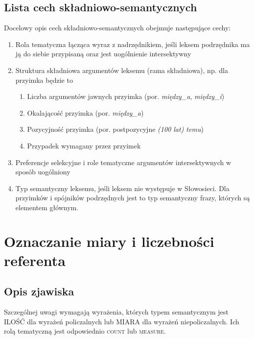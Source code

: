 \documentclass[a4paper, 12pt]{article}
\theoremstyle{remark}
\begin{document}
\subsection{Lista cech składniowo-semantycznych} %
\label{sub:cechy_ala_Walenty}

Docelowy opis cech składniowo-semantycznych obejmuje następujące cechy:

\begin{enumerate}
\item Rola tematyczna łącząca wyraz z nadrzędnikiem, jeśli leksem podrzędnika ma ją do siebie przypisaną oraz jest uogólnienie intersektywny
\item Struktura składniowa argumentów leksemu (rama składniowa), np. dla przyimka będzie to
\begin{enumerate}
\item Liczba argumentów jawnych przyimka (por. \emph{między\_a}, \emph{między\_i})
\item Okalającość przyimka (por. \emph{między\_a})
\item Pozycyjność przyimka (por. postpozycyjne  \emph{(100 lat) temu})
\item Przypadek wymagany przez przyimek
\end{enumerate}

\item Preferencje selekcyjne i role tematyczne argumentów intersektywnych w sposób uogólniony
\item Typ semantyczny leksemu, jeśli leksem nie występuje w Słowosieci. Dla przyimków i spójników podrzędnych jest to typ semantyczny frazy, których są elementem głównym.
\end{enumerate}

\section{Oznaczanie miary i liczebności referenta} %
{
\renewcommand\thesection{}
\renewcommand\thesubsection{}
\setcounter{subsection}{-1}
\subsection{Opis zjawiska} %
\label{sub:opis_zjawiska4}
}

Szczególnej uwagi wymagają wyrażenia, których typem semantycznym jest \textsf{ILOŚĆ} dla wyrażeń policzalnych lub \textsf{MIARA} dla wyrażeń niepoliczalnych. Ich rolą tematyczną jest odpowiednio \textsc{count} lub \textsc{measure}.
\end{document}
